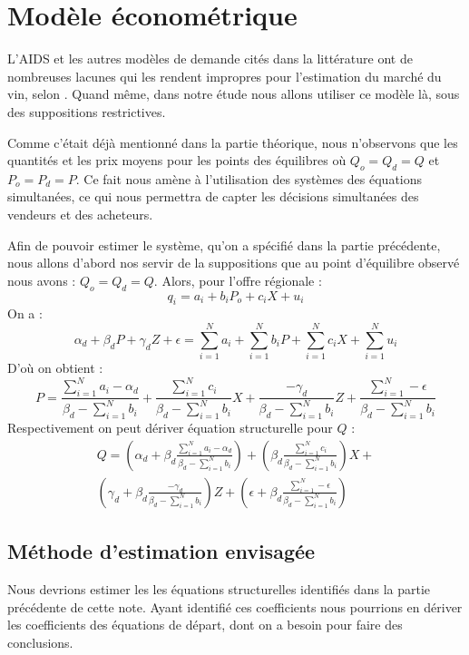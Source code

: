 \documentclass[11pt, a4paper]{article}
\begin{document}
\section*{Modèle économétrique}
L'AIDS et les autres modèles de demande cités dans la littérature ont de nombreuses lacunes qui les rendent impropres pour l'estimation du marché du vin, selon \citet{cembalo2014}. 
Quand même, dans notre étude nous allons utiliser ce modèle là, sous des suppositions restrictives. 
\par
Comme c'était déjà mentionné dans la partie théorique, nous n'observons que les quantités et les prix moyens pour les points des équilibres où $Q_o = Q_d = Q$ et $P_o = P_d = P$.
Ce fait nous amène à l'utilisation des systèmes des équations simultanées, ce qui nous permettra de capter les décisions simultanées des vendeurs et des acheteurs. 
\par 
Afin de pouvoir estimer le système, qu'on a spécifié dans la partie précédente, nous allons d'abord nos servir de la suppositions que au point d'équilibre observé nous avons : $Q_o = Q_d = Q$.
Alors, pour l'offre régionale :
\begin{equation}
    q_i = a_i + b_i P_o + c_i X + u_i
\end{equation} 
On a :
\begin{equation}
    \alpha_d + \beta_d P + \gamma_d Z + \epsilon = 
        \sum_{i = 1}^{N} a_i + \sum_{i = 1}^{N} b_i P + \sum_{i = 1}^{N} c_i X + \sum_{i = 1}^{N} u_i
\end{equation}
D'où on obtient :
\begin{equation}
    P = \frac{\sum_{i = 1}^{N} a_i - \alpha_d}{\beta_d - \sum_{i = 1}^{N} b_i} + 
        \frac{\sum_{i = 1}^{N} c_i}{\beta_d - \sum_{i = 1}^{N} b_i} X +
        \frac{-\gamma_d}{\beta_d - \sum_{i = 1}^{N} b_i} Z + 
        \frac{\sum_{i = 1}^{N} - \epsilon}{\beta_d - \sum_{i = 1}^{N} b_i}
\end{equation}
Respectivement on peut dériver équation structurelle pour $Q$ :
\begin{multline}
    Q = (\alpha_d + \beta_d \frac{\sum_{i = 1}^{N} a_i - \alpha_d}{\beta_d - \sum_{i = 1}^{N} b_i}) + 
        (\beta_d \frac{\sum_{i = 1}^{N} c_i}{\beta_d - \sum_{i = 1}^{N} b_i}) X + \\
        (\gamma_d + \beta_d \frac{-\gamma_d}{\beta_d - \sum_{i = 1}^{N} b_i}) Z + 
        (\epsilon + \beta_d \frac{\sum_{i = 1}^{N} - \epsilon}{\beta_d - \sum_{i = 1}^{N} b_i})
\end{multline}

\subsection*{Méthode d'estimation envisagée}
Nous devrions estimer les les équations structurelles identifiés dans la partie précédente de cette note. 
Ayant identifié ces coefficients nous pourrions en dériver les coefficients des équations de départ, dont on a besoin pour faire des conclusions.



\end{document}
